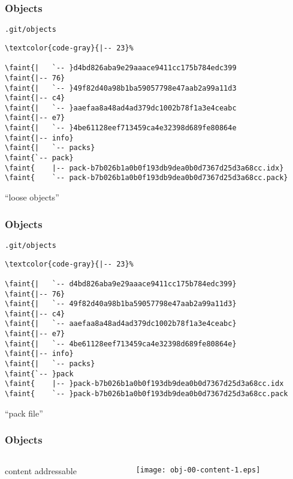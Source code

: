 \documentclass[english]{beamer}
\newcommand{\CMD}[1]{%
\texttt{\textcolor{code-green}{#1}}%
}
\newcommand{\faint}[1]{%
\textcolor{code-gray}{#1}%
}
\begin{document}
\begin{frame}[fragile]
\frametitle{Objects}
\CMD{.git/objects}
{\small
\begin{Verbatim}[commandchars=\\\{\}]
\faint{|-- 23}
\faint{|   `-- }d4bd826aba9e29aaace9411cc175b784edc399
\faint{|-- 76}
\faint{|   `-- }49f82d40a98b1ba59057798e47aab2a99a11d3
\faint{|-- c4}
\faint{|   `-- }aaefaa8a48ad4ad379dc1002b78f1a3e4ceabc
\faint{|-- e7}
\faint{|   `-- }4be61128eef713459ca4e32398d689fe80864e
\faint{|-- info}
\faint{|   `-- packs}
\faint{`-- pack}
\faint{    |-- pack-b7b026b1a0b0f193db9dea0b0d7367d25d3a68cc.idx}
\faint{    `-- pack-b7b026b1a0b0f193db9dea0b0d7367d25d3a68cc.pack}
\end{Verbatim}
}
\vspace{\baselineskip}
\begin{center}
``loose objects''
\end{center}
\vspace{\textheight}
\end{frame}

\begin{frame}[fragile]
\frametitle{Objects}
\CMD{.git/objects}
{\small
\begin{Verbatim}[commandchars=\\\{\}]
\faint{|-- 23}
\faint{|   `-- d4bd826aba9e29aaace9411cc175b784edc399}
\faint{|-- 76}
\faint{|   `-- 49f82d40a98b1ba59057798e47aab2a99a11d3}
\faint{|-- c4}
\faint{|   `-- aaefaa8a48ad4ad379dc1002b78f1a3e4ceabc}
\faint{|-- e7}
\faint{|   `-- 4be61128eef713459ca4e32398d689fe80864e}
\faint{|-- info}
\faint{|   `-- packs}
\faint{`-- }pack
\faint{    |-- }pack-b7b026b1a0b0f193db9dea0b0d7367d25d3a68cc.idx
\faint{    `-- }pack-b7b026b1a0b0f193db9dea0b0d7367d25d3a68cc.pack
\end{Verbatim}
}
\vspace{\baselineskip}
\begin{center}
``pack file''
\end{center}
\vspace{\textheight}
\end{frame}

\begin{frame}
\frametitle{Objects}
\begin{columns}[t]
        \begin{column}[T]{.5\textwidth}
                content addressable
        \end{column}
        \begin{column}[T]{.5\textwidth}
                \texttt{[image: obj-00-content-1.eps]}
        \end{column}
\end{columns}
\end{frame}
\end{document}
